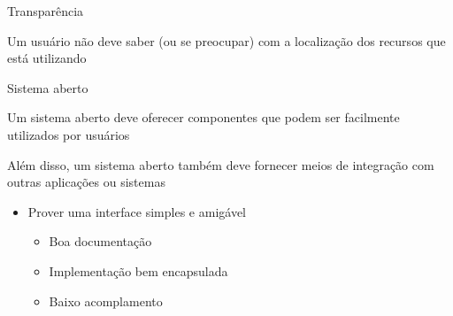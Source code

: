 \documentclass[compress]{beamer}
\begin{document}

\begin{frame}{Transparência}

Um usuário não deve saber (ou se preocupar) com a localização dos recursos que está utilizando

\begin{table}[]
\centering
{}
\end{table}


\end{frame}


\begin{frame}{Sistema aberto}

Um sistema aberto deve oferecer componentes que podem ser facilmente utilizados por usuários

\vspace{0.5cm}

Além disso, um sistema aberto também deve fornecer meios de integração com outras aplicações ou sistemas
\begin{itemize}
    \item Prover uma interface simples e amigável
    \begin{itemize}
        \item Boa documentação
        \item Implementação bem encapsulada
        \item Baixo acomplamento
    \end{itemize}
\end{itemize}

\end{frame}
\end{document}
